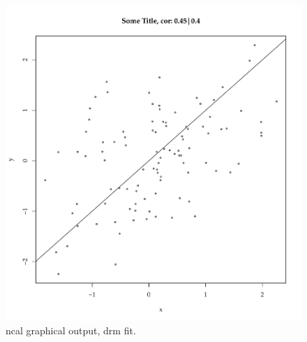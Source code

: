 \documentclass{article}\usepackage[]{graphicx}\usepackage[]{color}
\makeatletter
\def\maxwidth{ %
  \ifdim\Gin@nat@width>\linewidth
    \linewidth
  \else
    \Gin@nat@width
  \fi
}
\newenvironment{knitrout}{}{} %
\makeatother
\begin{document}
\begin{knitrout}
\begin{figure}[tbp]
{\centering \includegraphics[width=\maxwidth]{figure/minimal-corplot-1} 

}

\caption[ncal graphical output, drm fit]{ncal graphical output, drm fit.}\label{fig:corplot}
\end{figure}


\end{knitrout}
\end{document}
